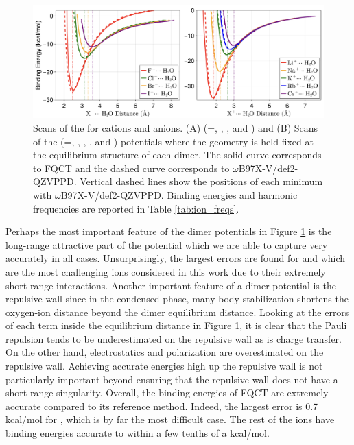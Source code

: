 \documentclass[journal=jctcce,manuscript=article]{achemso}
\begin{document}
\begin{figure}[h]
  \includegraphics*[width=\textwidth]{figures/anion-cation_dimer_scans.png}
  \caption{Scans of the  for cations and anions. (A) (=, , , and ) and (B) Scans of the  (=, , , , and )
  potentials where the geometry is held fixed at the equilibrium structure of each dimer.
  The solid curve corresponds to FQCT and the dashed curve corresponds to $\omega$B97X-V/def2-QZVPPD.
  Vertical dashed lines show the positions of each minimum with $\omega$B97X-V/def2-QZVPPD.
  Binding energies and harmonic frequencies are reported in Table \ref{tab:ion_freqs}.
  }\label{fig:ion_scans}
\end{figure}

Perhaps the most important feature of the dimer potentials in Figure \ref{fig:ion_scans} is the long-range attractive part of the potential which we are able to capture very accurately in all cases. Unsurprisingly, the largest errors are found for  and  which are the most challenging ions considered in this work due to their extremely short-range interactions. Another important feature of a dimer potential is the repulsive wall since in the condensed phase, many-body stabilization shortens the oxygen-ion distance beyond the dimer equilibrium distance. Looking at the errors of each term inside the equilibrium distance in Figure \ref{fig:ion_scans}, it is clear that the Pauli repulsion tends to be underestimated on the repulsive wall as is charge transfer. On the other hand, electrostatics and polarization are overestimated on the repulsive wall. Achieving accurate energies high up the repulsive wall is not particularly important beyond ensuring that the repulsive wall does not have a short-range singularity. Overall, the binding energies of FQCT are extremely accurate compared to its reference method. Indeed, the largest error is 0.7 kcal/mol for , which is by far the most difficult case. The rest of the ions have binding energies accurate to within a few tenths of a kcal/mol.
\end{document}
